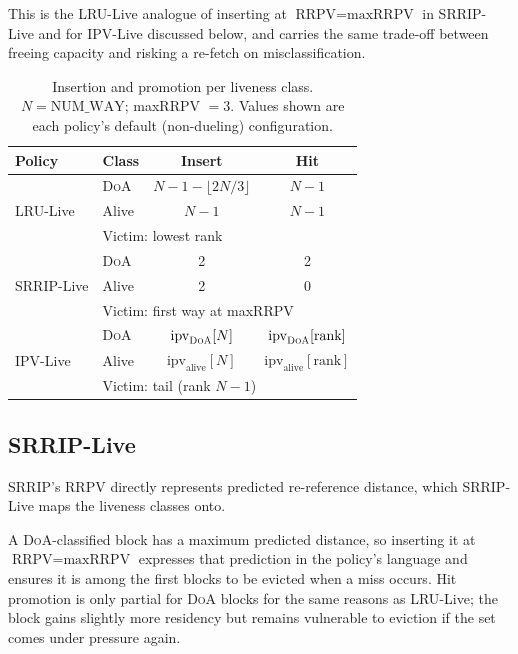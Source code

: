 \documentclass[conference]{IEEEtran}
\newcommand{\srrip}{\textsc{SRRIP}\xspace}
\newcommand{\ipv}{\textsc{IPV}\xspace}
\newcommand{\lru}{\textsc{LRU}\xspace}
\newcommand{\doa}{\textsc{DoA}\xspace}
\newcommand{\rrpv}{\textsc{RRPV}\xspace}
\begin{document}
This is the \lru-Live analogue of inserting at $\text{RRPV}=\text{maxRRPV}$ in
\srrip-Live and for \ipv-Live discussed below, and carries the same trade-off 
between freeing capacity and risking a re-fetch on misclassification.
\begin{table}[h!]
\centering
\renewcommand{\arraystretch}{1.15}
\footnotesize
\caption{Insertion and promotion per liveness class. $N = \text{NUM\_WAY}$;
  maxRRPV $=3$. Values shown are each policy's default (non-dueling) configuration.}
\label{tab:policy_actions}
\begin{tabular}{ll cc}
\toprule
Policy & Class & Insert & Hit \\
\midrule
\multirow{3}{*}{\lru-Live}
  & \doa  & $N{-}1{-}\lfloor 2N/3\rfloor$ & $N{-}1$ \\
  & Alive & $N{-}1$                       & $N{-}1$ \\
  & \multicolumn{3}{l}{Victim: lowest rank} \\
\midrule
\multirow{3}{*}{\srrip-Live}
  & \doa  & 2 & 2 \\
  & Alive & 2 & 0 \\
  & \multicolumn{3}{l}{Victim: first way at maxRRPV} \\
\midrule
\multirow{3}{*}{\ipv-Live}
  & \doa  & $\text{ipv}_{\doa}[N]$        & $\text{ipv}_{\doa}[\text{rank}]$ \\
  & Alive & $\text{ipv}_{\text{alive}}[N]$ & $\text{ipv}_{\text{alive}}[\text{rank}]$ \\
  & \multicolumn{3}{l}{Victim: tail (rank $N{-}1$)} \\
\bottomrule
\end{tabular}
\end{table}


\subsection{SRRIP-Live}

\srrip's \rrpv directly represents predicted re-reference distance, which 
\srrip-Live maps the liveness classes onto.

A \doa-classified block has a maximum predicted distance, so inserting it
at $\text{RRPV}=\text{maxRRPV}$ expresses that prediction in the policy's 
language and ensures it is among the first blocks to be evicted when a miss occurs.
Hit promotion is only partial for \doa blocks for the same reasons as \lru-Live;
the block gains slightly more residency but remains vulnerable to eviction if
the set comes under pressure again.
\end{document}

